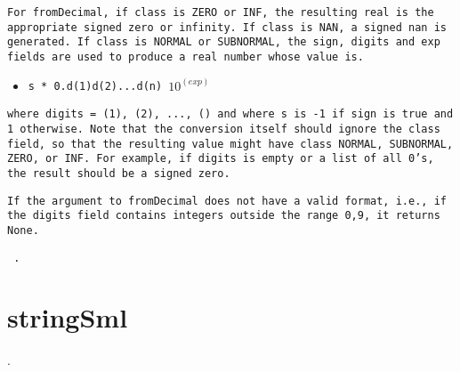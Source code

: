\documentclass[11pt]{report}
\begin{document}
\begin{itemize}
\begin{itemize}
\begin{itemize}
\begin{flushleft}
\texttt{For fromDecimal, if class is ZERO or INF, the resulting real is the appropriate signed zero or infinity. If class is NAN, a signed nan is generated. If class is NORMAL or SUBNORMAL, the sign, digits and exp fields are used to produce a real number whose value is. }\end{flushleft}
\coqdocemptyline

\begin{itemize}
\item  \texttt{s * 0.d(1)d(2)...d(n) $10^{(exp)}$}

\end{itemize}

\begin{flushleft} \texttt{where digits = (1), (2), ..., () and where s is -1 if sign is true and 1 otherwise. Note that the conversion itself should ignore the class field, so that the resulting value might have class NORMAL, SUBNORMAL, ZERO, or INF. For example, if digits is empty or a list of all 0's, the result should be a signed zero. }
\coqdocemptyline

\texttt{If the argument to fromDecimal does not have a valid format, i.e., if the digits field contains integers outside the range 0,9, it returns None.}
 \end{flushleft}

\end{itemize}

\end{itemize}

\end{itemize}
\begin{coqdoccode}
\coqdocemptyline
\coqdocemptyline
\coqdocnoindent
\texttt{ .\coqdoceol}
\coqdocemptyline
\end{coqdoccode}
\section*{stringSml}

\begin{coqdoccode}
\coqdocemptyline
\coqdocnoindent
{} .\coqdoceol
\coqdocemptyline
\end{coqdoccode}
\end{document}
